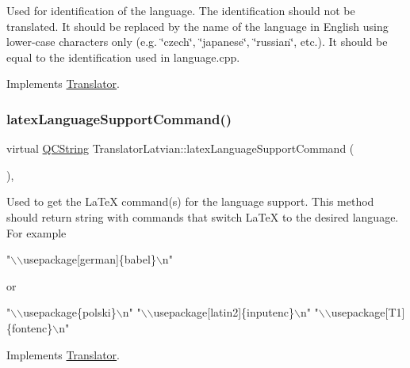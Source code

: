 Used for identification of the language. The identification should not be translated. It should be replaced by the name of the language in English using lower-\/case characters only (e.\+g. \char`\"{}czech\char`\"{}, \char`\"{}japanese\char`\"{}, \char`\"{}russian\char`\"{}, etc.). It should be equal to the identification used in language.\+cpp. 

Implements \mbox{\hyperlink{class_translator}{Translator}}.

\mbox{\label{class_translator_latvian_ad5a5a341d588b065968055dc1046f534}} 
\subsubsection{\texorpdfstring{latexLanguageSupportCommand()}{latexLanguageSupportCommand()}}
{\footnotesize\ttfamily virtual \mbox{\hyperlink{class_q_c_string}{Q\+C\+String}} Translator\+Latvian\+::latex\+Language\+Support\+Command (\begin{DoxyParamCaption}{ }\end{DoxyParamCaption})\hspace{0.3cm}{\ttfamily [inline]}, {\ttfamily [virtual]}}

Used to get the La\+TeX command(s) for the language support. This method should return string with commands that switch La\+TeX to the desired language. For example 
\begin{DoxyPre}"\(\backslash\)\(\backslash\)usepackage[german]\{babel\}\(\backslash\)n"
\end{DoxyPre}
 or 
\begin{DoxyPre}"\(\backslash\)\(\backslash\)usepackage\{polski\}\(\backslash\)n"
"\(\backslash\)\(\backslash\)usepackage[latin2]\{inputenc\}\(\backslash\)n"
"\(\backslash\)\(\backslash\)usepackage[T1]\{fontenc\}\(\backslash\)n"
\end{DoxyPre}
 

Implements \mbox{\hyperlink{class_translator}{Translator}}.

\mbox{\label{class_translator_latvian_ac2eb645cd5e2482eb39b911de950e6cb}} 

